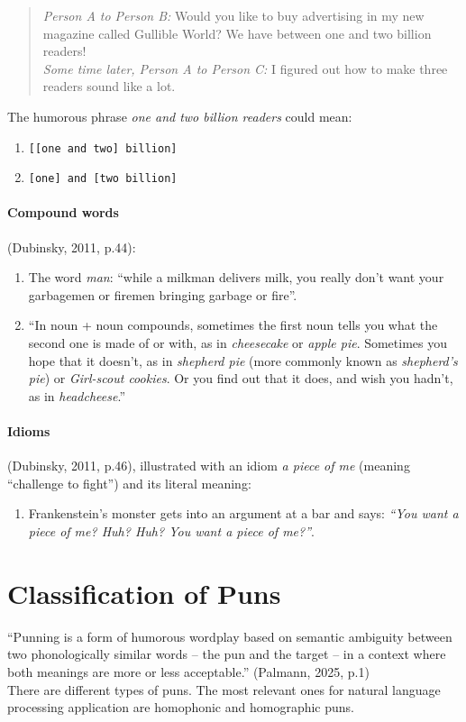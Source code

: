 \documentclass[10pt]{article}
\begin{document}
\begin{quote}
\textit{Person A to Person B:} Would you like to buy advertising in my new magazine called Gullible World? We have between one and two billion readers!\\[6pt]
\textit{Some time later, Person A to Person C:} I figured out how to make three readers sound like a lot.
\end{quote}

The humorous phrase \textit{one and two billion readers} could mean:
\begin{enumerate}
    \item \verb|[[one and two] billion]|
    \item \verb|[one] and [two billion]|
\end{enumerate}

\paragraph{Compound words} (Dubinsky, 2011, p.44): 

\begin{enumerate}
    \item The word \textit{man}: ``while a milkman delivers milk, you really don't want your garbagemen or firemen bringing garbage or fire''.

    \item ``In noun + noun compounds, sometimes the first noun tells you what the second one is made of or with, as in \textit{cheesecake} or \textit{apple pie}. Sometimes you hope that it doesn't, as in \textit{shepherd pie} (more commonly known as \textit{shepherd's pie}) or \textit{Girl-scout cookies}. Or you find out that it does, and wish you hadn't, as in \textit{headcheese}.'' 
\end{enumerate}


\paragraph{Idioms}  (Dubinsky, 2011, p.46), illustrated with an idiom \textit{a piece of me} (meaning “challenge to fight”) and its literal meaning:


\begin{enumerate}
    \item Frankenstein’s monster gets into an argument at a bar and says: \textit{“You want a piece of me? Huh? Huh? You want a piece of me?”}.
\end{enumerate}

\section{Classification of Puns}
“Punning is a form of humorous wordplay based on semantic ambiguity between two phonologically similar words – the pun and the target – in a context where both meanings are more or less acceptable.” (Palmann, 2025, p.1)\\[6pt]
There are different types of puns. The most relevant ones for natural language processing application are homophonic and homographic puns.
\end{document}
